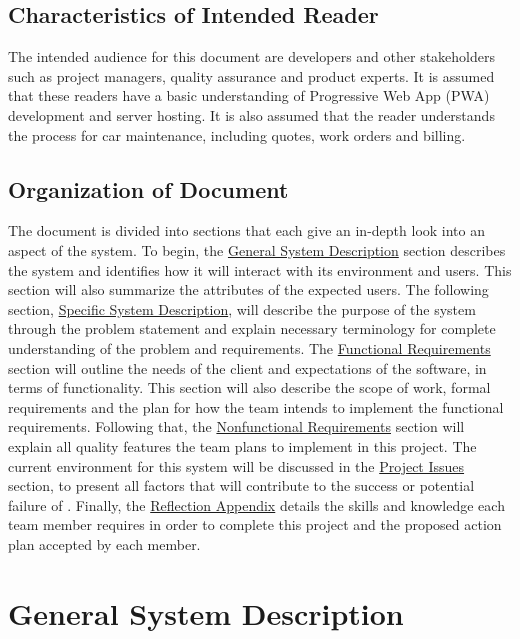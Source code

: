 \documentclass[12pt]{article}
\begin{document}
\subsection{Characteristics of Intended Reader} \label{sec_IntendedReader}

  The intended audience for this document are developers and other stakeholders such as project managers, quality assurance and product experts. It is assumed that these readers have a basic understanding of Progressive Web App (PWA) development and server hosting. It is also assumed that the reader understands the process for car maintenance, including quotes, work orders and billing.

\subsection{Organization of Document}

  The document is divided into sections that each give an in-depth look into an aspect of the system. To begin, the \hyperref[sec:GSD]{General System Description} section describes the system and identifies how it will interact with its environment and users. This section will also summarize the attributes of the expected users. The following section, \hyperref[sec:SSD]{Specific System Description}, will describe the purpose of the system through the problem statement and explain necessary terminology for complete understanding of the problem and requirements. The \hyperref[sec:FuncReq]{Functional Requirements} section will outline the needs of the client and expectations of the software, in terms of functionality. This section will also describe the scope of work, formal requirements and the plan for how the team intends to implement the functional requirements. Following that, the \hyperref[sec:NFuncReq]{Nonfunctional Requirements} section will explain all quality features the team plans to implement in this project. The current environment for this system will be discussed in the \hyperref[sec:PI]{Project Issues} section, to present all factors that will contribute to the success or potential failure of \progname{}. Finally, the \hyperref[sec:refAppendix]{Reflection Appendix} details the skills and knowledge each team member requires in order to complete this project and the proposed action plan accepted by each member. 

\section{General System Description} \label{sec:GSD}
\end{document}
